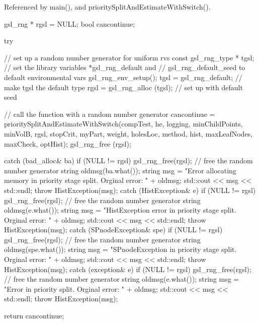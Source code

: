 \-Referenced by main(), and priority\-Split\-And\-Estimate\-With\-Switch().


\begin{DoxyCode}
{
    gsl_rng * rgsl = NULL;
    bool cancontinue;

    try {
        // set up a random number generator for uniform rvs
        const gsl_rng_type * tgsl;
        // set the library variables *gsl_rng_default and
        // gsl_rng_default_seed to default environmental vars
        gsl_rng_env_setup();
        tgsl = gsl_rng_default; // make tgsl the default type
        rgsl = gsl_rng_alloc (tgsl); // set up with default seed

        // call the function with a random number generator
        cancontinue = prioritySplitAndEstimateWithSwitch(compTest, he, logging,
       minChildPoints, 
                        minVolB, rgsl, stopCrit, myPart, weight, holesLoc,
                        method, hist,
                        maxLeafNodes, maxCheck, optHist);
        gsl_rng_free (rgsl);
    }

    catch (bad_alloc& ba) {
        if (NULL != rgsl) gsl_rng_free(rgsl); // free the random number
       generator
        string oldmsg(ba.what());
        string msg = "Error allocating memory in priority stage split.  Orginal
       error: "
                                     + oldmsg;
        std::cout << msg << std::endl;
        throw HistException(msg);
    }
    catch (HistException& e) {
        if (NULL != rgsl) gsl_rng_free(rgsl); // free the random number
       generator
        string oldmsg(e.what());
        string msg = "HistException error in priority stage split.  Orginal
       error: "
                                    + oldmsg;
        std::cout << msg << std::endl;
        throw HistException(msg);
    }
    catch (SPnodeException& spe) {
        if (NULL != rgsl) gsl_rng_free(rgsl); // free the random number
       generator
        string oldmsg(spe.what());
        string msg = "SPnodeException in priority stage split.  Orginal error: 
      "
                                    + oldmsg;
        std::cout << msg << std::endl;
        throw HistException(msg);
    }
    catch (exception& e) {
        if (NULL != rgsl) gsl_rng_free(rgsl); // free the random number
       generator
        string oldmsg(e.what());
        string msg = "Error in priority split.  Orginal error: " + oldmsg;
        std::cout << msg << std::endl;
        throw HistException(msg);
    }
   
   return cancontinue;
}
\end{DoxyCode}

